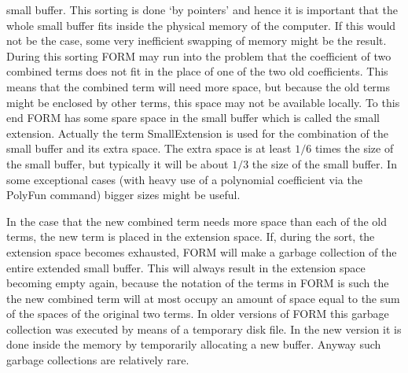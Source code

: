 small buffer. This sorting is done 
`by pointers' and hence it is important that the whole small buffer fits 
inside the physical memory of the computer. If this would not be the case, 
some very inefficient swapping of memory might be the result. During this 
sorting FORM may run into the problem that the coefficient of two combined 
terms does not fit in the place of one of the two old coefficients. This 
means that the combined term will need more space, but because the old 
terms might be enclosed by other terms, this space may not be available 
locally. To this end FORM has some spare space in the small buffer which is 
called the small extension. 
Actually the term SmallExtension is used for the 
combination of the small buffer and its extra space. The extra space is at 
least $1/6$ times the size of the small buffer, but typically it will be 
about $1/3$ the size of the small buffer. In some exceptional cases (with 
heavy use of a polynomial coefficient via the PolyFun 
command) bigger sizes might be useful.

In the case that the new combined term needs more space than each of the 
old terms, the new term is placed in the extension space. If, during the 
sort, the extension space becomes exhausted, FORM will make a 
garbage 
collection of the entire extended small buffer. This will always result in 
the extension space becoming empty again, because the notation of the terms 
in FORM is such the the new combined term will at most occupy an amount 
of space equal to the sum of the spaces of the original two terms. In older 
versions of FORM this garbage collection was executed by means of a 
temporary disk file. In the new version it is done inside the memory by 
temporarily allocating a new buffer. Anyway such garbage collections are 
relatively rare.


